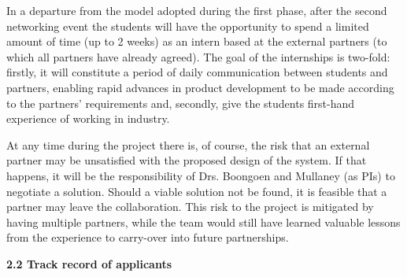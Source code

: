 \documentclass[11pt]{article}
\begin{document}
  \vspace{2mm}
  \noindent
  In a departure from the model adopted during the first phase, after the second networking event the students will have the opportunity to spend a limited amount of time (up to 2 weeks) as an intern based at the external partners (to which all partners have already agreed). The goal of the internships is two-fold: firstly, it will constitute a period of daily communication between students and partners, enabling rapid advances in product development to be made according to the partners' requirements and, secondly, give the students first-hand experience of working in industry.

  \vspace{2mm}
  \noindent
  At any time during the project there is, of course, the risk that an external partner may be unsatisfied with the proposed design of the system. If that happens, it will be the responsibility of Drs. Boongoen and Mullaney (as PIs) to negotiate a solution. Should a viable solution not be found, it is feasible that a partner may leave the collaboration. This risk to the project is mitigated by having multiple partners, while the team would still have learned valuable lessons from the experience to carry-over into future partnerships.
    
  \pagebreak
  \noindent
  {\large \bf 2.2 Track record of applicants}
  
\end{document}
